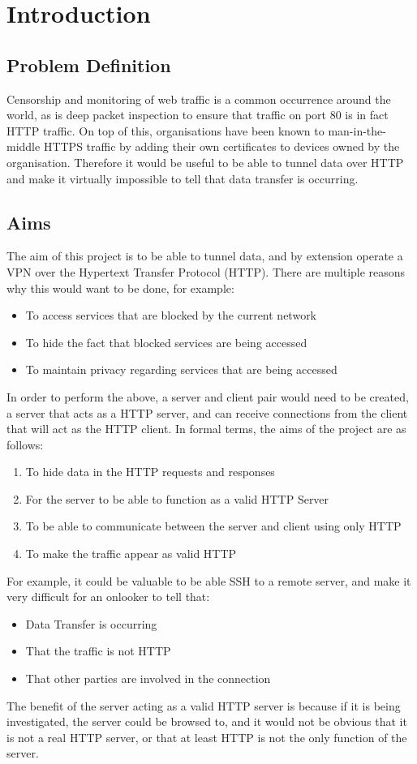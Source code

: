 \section{Introduction}
\subsection{Problem Definition}
Censorship and monitoring of web traffic is a common occurrence around the world, as is deep packet inspection to ensure that traffic on port 80 is in fact HTTP traffic.
On top of this, organisations have been known to man-in-the-middle HTTPS traffic by adding their own certificates to devices owned by the organisation.
Therefore it would be useful to be able to tunnel data over HTTP and make it virtually impossible to tell that data transfer is occurring.

\subsection{Aims}
The aim of this project is to be able to tunnel data, and by extension operate a VPN over the Hypertext Transfer Protocol (HTTP). There are multiple reasons why this would want to be done, for example:
\begin{itemize}
    \item To access services that are blocked by the current network
    \item To hide the fact that blocked services are being accessed
    \item To maintain privacy regarding services that are being accessed
\end{itemize}
In order to perform the above, a server and client pair would need to be created, a server that acts as a HTTP server, and can receive connections from the client that will act as the HTTP client.
\vspace{0.5cm}
In formal terms, the aims of the project are as follows:
\begin{enumerate}
    \item To hide data in the HTTP requests and responses
    \item For the server to be able to function as a valid HTTP Server
    \item To be able to communicate between the server and client using only HTTP
    \item To make the traffic appear as valid HTTP
\end{enumerate}
For example, it could be valuable to be able SSH to a remote server, and make it very difficult for an onlooker to tell that:
\begin{itemize}
    \item Data Transfer is occurring
    \item That the traffic is not HTTP
    \item That other parties are involved in the connection
\end{itemize}
The benefit of the server acting as a valid HTTP server is because if it is being investigated, the server could be browsed to, and it would not be obvious that it is not a real HTTP server, or that at least HTTP is not the only function of the server.

